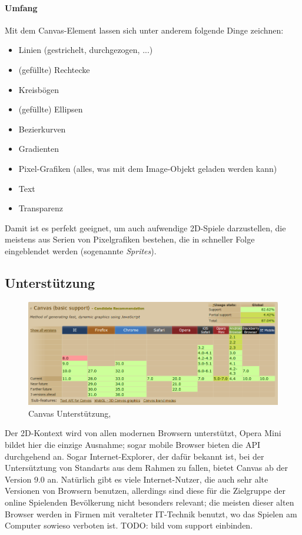 \documentclass[a4paper, 12pt]{article}
\begin{document}
\paragraph{Umfang} Mit dem Canvas-Element lassen sich unter anderem folgende Dinge zeichnen:
\begin{itemize}
	\item Linien (gestrichelt, durchgezogen, ...)
	\item (gefüllte) Rechtecke
	\item Kreisbögen
	\item (gefüllte) Ellipsen
	\item Bezierkurven
	\item Gradienten
	\item Pixel-Grafiken (alles, was mit dem Image-Objekt geladen werden kann)
	\item Text
	\item Transparenz
\end{itemize}
Damit ist es perfekt geeignet, um auch aufwendige 2D-Spiele darzustellen, die meistens aus Serien von Pixelgrafiken bestehen, die in schneller Folge eingeblendet werden (sogenannte \emph{Sprites}).\cite{CanvasUmfang}
\subsection{Unterstützung}
\begin{figure}[H]
	\begin{center}
		\includegraphics[width=\textwidth]{assets/canvas_support.png} 
	\end{center}
	\caption{Canvas Unterstützung, \cite{CanIUseCanvas}}
	\label{canvas_support}
\end{figure}
Der 2D-Kontext wird von allen modernen Browsern unterstützt, Opera Mini bildet hier die einzige Ausnahme; sogar mobile Browser bieten die API durchgehend an. Sogar Internet-Explorer, der dafür bekannt ist, bei der Untersütztung von Standarts aus dem Rahmen zu fallen, bietet Canvas ab der Version 9.0 an. Natürlich gibt es viele Internet-Nutzer, die auch sehr alte Versionen von Browsern benutzen, allerdings sind diese für die Zielgruppe der online Spielenden Bevölkerung nicht besonders relevant; die meisten dieser alten Browser werden in Firmen mit veralteter IT-Technik benutzt, wo das Spielen am Computer sowieso verboten ist.
TODO: bild vom support einbinden.
\end{document}
